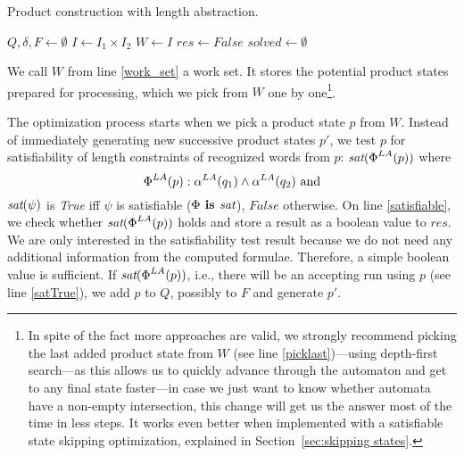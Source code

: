 \begin{algorithm}
\caption{Product construction with length abstraction.}\label{productConstructionLengthAbstrAlg}
\DontPrintSemicolon
{}
\BlankLine
$Q, \delta, F \gets \emptyset$ \;
$I \gets I_1 \times I_2$ \;
$W \gets I$ \;\label{work_set}
$res \gets False$ \;\label{sat}
$solved \gets \emptyset$ \;\label{solved}
\end{algorithm}

We call $W$ from line \ref{work_set} a work set. It stores the potential product states prepared for processing, which we pick from $W$ one by one\footnote{In spite of the fact more approaches are valid, we strongly recommend picking the last added product state from $W$ (see line \ref{picklast})---using depth-first search---as this allows us to quickly advance through the automaton and get to any final state faster---in case we just want to know whether automata have a non-empty intersection, this change will get us the answer most of the time in less steps. It works even better when implemented with a satisfiable state skipping optimization, explained in Section~\ref{sec:skipping states}.}.

The optimization process starts when we pick a product state $p$ from $W$. Instead of immediately generating new successive product states $p'$, we test $p$ for satisfiability of length constraints of recognized words from $p$: $\emph{sat}(\emph{$\Phi$}^{LA}(p))$ where
\[
    \emph{$\Phi$}^{LA}(p) : \alpha^{LA}(q_1) \wedge \alpha^{LA}(q_2) \text{ and}
\]
$\emph{sat}(\psi)$ is \emph{True} iff $\psi$ is satisfiable ($\Phi \textbf{ is } \emph{sat}$), $False$ otherwise. On line \ref{satisfiable}, we check whether $\emph{sat}(\emph{$\Phi$}^{LA}(p))$ holds and store a result as a boolean value to $res$. We are only interested in the satisfiability test result because we do not need any additional information from the computed formulae. Therefore, a simple boolean value is sufficient. If $\emph{sat}(\emph{$\Phi$}^{LA}(p))$, i.e., there will be an accepting run using $p$ (see line \ref{satTrue}), we add $p$ to $Q$, possibly to $F$ and generate $p'$.

